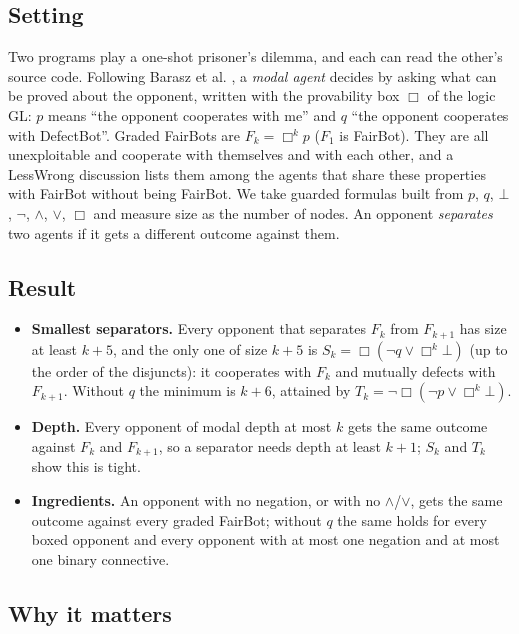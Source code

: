 \documentclass{article}
\begin{document}
\subsection*{Setting}

Two programs play a one-shot prisoner's dilemma, and each can read the other's source code.
Following Barasz et al. \cite{barasz2014robust}, a \emph{modal agent} decides by asking what can be proved
about the opponent, written with the provability box $\Box$ of the logic GL: $p$ means ``the
opponent cooperates with me'' and $q$ ``the opponent cooperates with DefectBot''. Graded FairBots
are $F_k = \Box^k p$ ($F_1$ is FairBot). They are all unexploitable and cooperate with themselves
and with each other, and a LessWrong discussion \cite{onlyonefairbot2026} lists them among the agents
that share these properties with FairBot without being FairBot. We take guarded formulas built
from $p$, $q$, $\bot$, $\neg$, $\wedge$, $\vee$, $\Box$ and measure size as the number of nodes. An
opponent \emph{separates} two agents if it gets a different outcome against them.

\subsection*{Result}

\begin{itemize}
\item \textbf{Smallest separators.} Every opponent that separates $F_k$ from $F_{k+1}$ has size at least $k+5$, and the only one of size $k+5$ is $S_k = \Box(\neg q \vee \Box^k\bot)$ (up to the order of the disjuncts): it cooperates with $F_k$ and mutually defects with $F_{k+1}$. Without $q$ the minimum is $k+6$, attained by $T_k = \neg\Box(\neg p \vee \Box^k\bot)$.
\item \textbf{Depth.} Every opponent of modal depth at most $k$ gets the same outcome against $F_k$ and $F_{k+1}$, so a separator needs depth at least $k+1$; $S_k$ and $T_k$ show this is tight.
\item \textbf{Ingredients.} An opponent with no negation, or with no $\wedge$/$\vee$, gets the same outcome against every graded FairBot; without $q$ the same holds for every boxed opponent and every opponent with at most one negation and at most one binary connective.
\end{itemize}

\subsection*{Why it matters}
\end{document}
